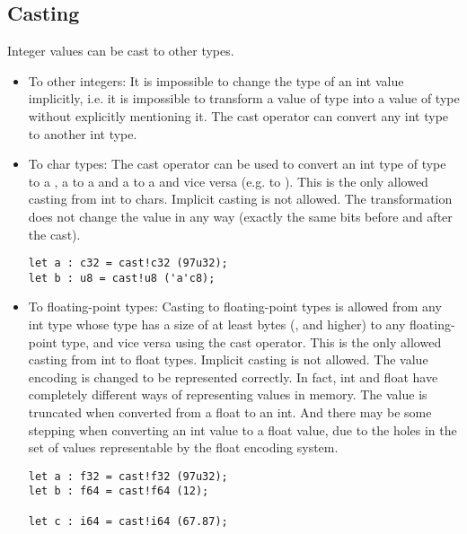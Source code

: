 \subsection{Casting}
\label{sec:orgfdc3d25}

Integer values can be cast to other types.

\begin{itemize}
  \setlength\itemsep{-4pt}
\item To other integers: It is impossible to change the type of an int value
implicitly, i.e. it is impossible to transform a value of type  into
a value of type  without explicitly mentioning it. The cast operator
 can convert any int type to another int type.


\item To char types: The cast operator can be used to convert an int type of
  type  to a , a  to a  and a
   to a  and vice versa (e.g.  to
  ). This is the only allowed casting from int to chars. Implicit
  casting is not allowed. The transformation does not change the value in any
  way (exactly the same bits before and after the cast).

  \begin{lstlisting}[style=coloredverbatim]
let a : c32 = cast!c32 (97u32);
let b : u8 = cast!u8 ('a'c8);
  \end{lstlisting}

\item To floating-point types: Casting to floating-point types is allowed from
  any int type whose type has a size of at least  bytes (,
   and higher) to any floating-point type, and vice versa using the
  cast operator. This is the only allowed casting from int to float types.
  Implicit casting is not allowed. The value encoding is changed to be
  represented correctly. In fact, int and float have completely different ways
  of representing values in memory. The value is truncated when converted from a
  float to an int. And there may be some stepping when converting an int value
  to a float value, due to the holes in the set of values representable by the
  float encoding system.

  \begin{lstlisting}[style=coloredverbatim]
let a : f32 = cast!f32 (97u32);
let b : f64 = cast!f64 (12);

let c : i64 = cast!i64 (67.87);
  \end{lstlisting}

\end{itemize}

